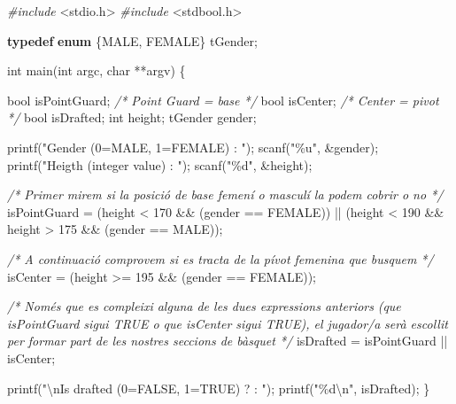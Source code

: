 \documentclass[]{book}
\newenvironment{Shaded}{\begin{snugshade}}{\end{snugshade}}
\newcommand{\CommentTok}[1]{\textcolor[rgb]{0.56,0.35,0.01}{\textit{#1}}}
\newcommand{\DataTypeTok}[1]{\textcolor[rgb]{0.13,0.29,0.53}{#1}}
\newcommand{\DecValTok}[1]{\textcolor[rgb]{0.00,0.00,0.81}{#1}}
\newcommand{\ImportTok}[1]{#1}
\newcommand{\KeywordTok}[1]{\textcolor[rgb]{0.13,0.29,0.53}{\textbf{#1}}}
\newcommand{\NormalTok}[1]{#1}
\newcommand{\PreprocessorTok}[1]{\textcolor[rgb]{0.56,0.35,0.01}{\textit{#1}}}
\newcommand{\SpecialCharTok}[1]{\textcolor[rgb]{0.00,0.00,0.00}{#1}}
\newcommand{\StringTok}[1]{\textcolor[rgb]{0.31,0.60,0.02}{#1}}
\begin{document}
\begin{Shaded}
\begin{Highlighting}[]
\PreprocessorTok{\#include }\ImportTok{\textless{}stdio.h\textgreater{}}
\PreprocessorTok{\#include }\ImportTok{\textless{}stdbool.h\textgreater{}}

\KeywordTok{typedef} \KeywordTok{enum}\NormalTok{ \{MALE, FEMALE\} tGender;}

\DataTypeTok{int}\NormalTok{ main(}\DataTypeTok{int}\NormalTok{ argc, }\DataTypeTok{char}\NormalTok{ **argv) \{}

    \DataTypeTok{bool}\NormalTok{ isPointGuard; }\CommentTok{/* Point Guard = base */}
    \DataTypeTok{bool}\NormalTok{ isCenter;     }\CommentTok{/* Center = pivot */}
    \DataTypeTok{bool}\NormalTok{ isDrafted;}
    \DataTypeTok{int}\NormalTok{ height;}
\NormalTok{    tGender gender;}

\NormalTok{    printf(}\StringTok{"Gender (0=MALE, 1=FEMALE) : "}\NormalTok{);}
\NormalTok{    scanf(}\StringTok{"\%u"}\NormalTok{, \&gender);}
\NormalTok{    printf(}\StringTok{"Heigth (integer value) : "}\NormalTok{);}
\NormalTok{    scanf(}\StringTok{"\%d"}\NormalTok{, \&height);}

    \CommentTok{/* Primer mirem si la posició de base femení o masculí la podem cobrir o no */}
\NormalTok{    isPointGuard = }
\NormalTok{        (height \textless{} }\DecValTok{170}\NormalTok{ \&\& (gender == FEMALE)) ||}
\NormalTok{        (height \textless{} }\DecValTok{190}\NormalTok{ \&\& height \textgreater{} }\DecValTok{175}\NormalTok{ \&\& (gender == MALE));}

    \CommentTok{/* A continuació comprovem si es tracta de la pívot femenina que busquem */}
\NormalTok{    isCenter = (height \textgreater{}= }\DecValTok{195}\NormalTok{ \&\& (gender == FEMALE));}

    \CommentTok{/* Només que es compleixi alguna de les dues expressions anteriors }
\CommentTok{       (que isPointGuard sigui TRUE o que isCenter sigui TRUE), el jugador/a }
\CommentTok{       serà escollit per formar part de les nostres seccions de bàsquet */}
\NormalTok{    isDrafted = isPointGuard || isCenter;}

\NormalTok{    printf(}\StringTok{"}\SpecialCharTok{\textbackslash{}n}\StringTok{Is drafted (0=FALSE, 1=TRUE) ? : "}\NormalTok{);}
\NormalTok{    printf(}\StringTok{"\%d}\SpecialCharTok{\textbackslash{}n}\StringTok{"}\NormalTok{, isDrafted);}
\NormalTok{\}}
\end{Highlighting}
\end{Shaded}
\end{document}
